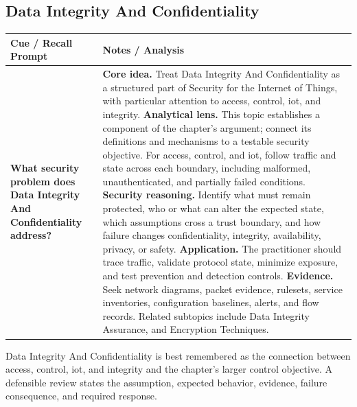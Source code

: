 \documentclass[11pt]{article}
\newcommand{\CornellHeader}{%
\rowcolor{Navy}\color{white}\bfseries Cue / Recall Prompt & \color{white}\bfseries Notes / Analysis\\\hline}
\newcommand{\CornellRow}[2]{%
\cellcolor{CueGray}\RaggedRight\textbf{#1} & \RaggedRight #2\\\hline}
\begin{document}
\subsection*{Data Integrity And Confidentiality}
\begin{longtable}{>{\RaggedRight\arraybackslash}p{}|>{\RaggedRight\arraybackslash}p{}}
\CornellHeader
\CornellRow{What security problem does Data Integrity And Confidentiality address?}{\textbf{Core idea.} Treat Data Integrity And Confidentiality as a structured part of Security for the Internet of Things, with particular attention to access, control, iot, and integrity. \textbf{Analytical lens.} This topic establishes a component of the chapter's argument; connect its definitions and mechanisms to a testable security objective. For access, control, and iot, follow traffic and state across each boundary, including malformed, unauthenticated, and partially failed conditions. \textbf{Security reasoning.} Identify what must remain protected, who or what can alter the expected state, which assumptions cross a trust boundary, and how failure changes confidentiality, integrity, availability, privacy, or safety. \textbf{Application.} The practitioner should trace traffic, validate protocol state, minimize exposure, and test prevention and detection controls. \textbf{Evidence.} Seek network diagrams, packet evidence, rulesets, service inventories, configuration baselines, alerts, and flow records. Related subtopics include Data Integrity Assurance, and Encryption Techniques.}
\end{longtable}
\begin{topicsummary}
Data Integrity And Confidentiality is best remembered as the connection between access, control, iot, and integrity and the chapter's larger control objective. A defensible review states the assumption, expected behavior, evidence, failure consequence, and required response.
\end{topicsummary}
\end{document}
